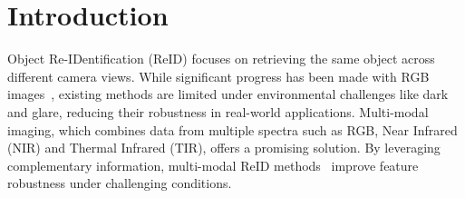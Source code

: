 \section{Introduction}
\label{sec:intro}
Object Re-IDentification (ReID) focuses on retrieving the same object across different camera views. 
%
While significant progress has been made with RGB images~\cite{he2021transreid,liu2021watching,zhang2021hat,wang2021pyramid,liu2023deeply,shi2024learning,wang2024other,liu2024video,yu2024tf,yang2024shallow,gong2024cross,wang2025unity}, existing methods are limited under environmental challenges like dark and glare, reducing their robustness in real-world applications.
%
Multi-modal imaging, which combines data from multiple spectra such as RGB, Near Infrared (NIR) and Thermal Infrared (TIR), offers a promising solution. 
%
By leveraging complementary information, multi-modal ReID methods~\cite{lu2023learning,crawford2023unicat,wang2024top,zhang2024magic} improve feature robustness under challenging conditions.
%

